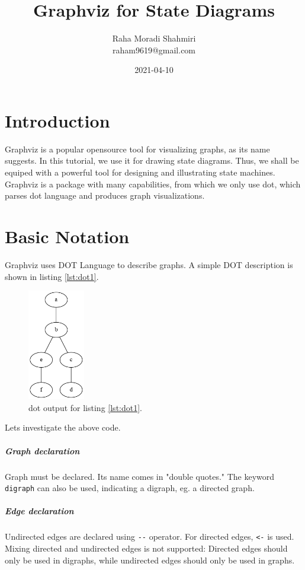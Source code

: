 \documentclass{article}
\title{Graphviz for State Diagrams}
\date{2021-04-10}
\author{Raha Moradi Shahmiri\\raham9619@gmail.com}
\begin{document}
	\maketitle
	\newpage


	\section{Introduction}
	Graphviz is a popular opensource tool for visualizing graphs, as its name suggests. In this tutorial, we use it for drawing state diagrams. Thus, we shall be equiped with a powerful tool for designing and illustrating state machines. Graphviz is a package with many capabilities, from which we only use dot, which parses dot language and produces graph visualizations.

	\section{Basic Notation}
	Graphviz uses DOT Language to describe graphs. A simple DOT description is shown in listing \ref{lst:dot1}.

	
	
	\begin{figure}[H]
		\begin{center}
			\includegraphics[width=25mm]{figure1.png}
		\end{center}
		\caption{dot output for listing \ref{lst:dot1}.}
		\label{fig:png1}
	\end{figure}

	Lets investigate the above code.
	
	\subparagraph{Graph declaration}
		Graph must be declared. Its name comes in "double quotes." The keyword \lstinline{digraph} can also be used, indicating a digraph, eg. a directed graph.
	
	\subparagraph{Edge declaration}
		Undirected edges are declared using \lstinline{--} operator. For directed edges, \lstinline{<-} is used. Mixing directed and undirected edges is not supported: Directed edges should only be used in digraphs, while undirected edges should only be used in graphs.
\end{document}
